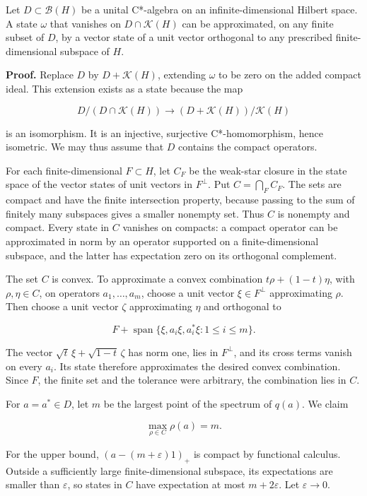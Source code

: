 \documentclass[
  11pt,
]{article}
\newcounter{none} %
\begin{document}
Let \(D\subset\mathcal B(H)\) be a unital C*-algebra on an
infinite-dimensional Hilbert space. A state \(\omega\) that vanishes on
\(D\cap\mathcal K(H)\) can be approximated, on any finite subset of
\(D\), by a vector state of a unit vector orthogonal to any prescribed
finite-dimensional subspace of \(H\).

\textbf{Proof.} Replace \(D\) by \(D+\mathcal K(H)\), extending
\(\omega\) to be zero on the added compact ideal. This extension exists
as a state because the map

\[
D/(D\cap\mathcal K(H))\longrightarrow
(D+\mathcal K(H))/\mathcal K(H)
\]

is an isomorphism. It is an injective, surjective C*-homomorphism, hence
isometric. We may thus assume that \(D\) contains the compact operators.

For each finite-dimensional \(F\subset H\), let \(C_F\) be the weak-star
closure in the state space of the vector states of unit vectors in
\(F^\perp\). Put \(C=\bigcap_F C_F\). The sets are compact and have the
finite intersection property, because passing to the sum of finitely
many subspaces gives a smaller nonempty set. Thus \(C\) is nonempty and
compact. Every state in \(C\) vanishes on compacts: a compact operator
can be approximated in norm by an operator supported on a
finite-dimensional subspace, and the latter has expectation zero on its
orthogonal complement.

The set \(C\) is convex. To approximate a convex combination
\(t\rho+(1-t)\eta\), with \(\rho,\eta\in C\), on operators
\(a_1,\ldots,a_m\), choose a unit vector \(\xi\in F^\perp\)
approximating \(\rho\). Then choose a unit vector \(\zeta\)
approximating \(\eta\) and orthogonal to

\[
F+\operatorname{span}\{\xi,a_i\xi,a_i^*\xi:1\leq i\leq m\}.
\]

The vector \(\sqrt t\,\xi+\sqrt{1-t}\,\zeta\) has norm one, lies in
\(F^\perp\), and its cross terms vanish on every \(a_i\). Its state
therefore approximates the desired convex combination. Since \(F\), the
finite set and the tolerance were arbitrary, the combination lies in
\(C\).

For \(a=a^*\in D\), let \(m\) be the largest point of the spectrum of
\(q(a)\). We claim

\[
\max_{\rho\in C}\rho(a)=m.
\]

For the upper bound, \((a-(m+\varepsilon)1)_+\) is compact by functional
calculus. Outside a sufficiently large finite-dimensional subspace, its
expectations are smaller than \(\varepsilon\), so states in \(C\) have
expectation at most \(m+2\varepsilon\). Let \(\varepsilon\to0\).
\end{document}
